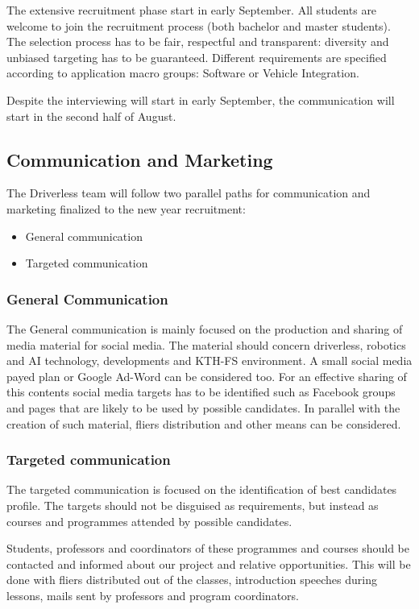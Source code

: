 \documentclass[graybox]{svmult}
\begin{document}
The extensive recruitment phase start in early September.
All students are welcome to join the recruitment process (both bachelor and master students).
The selection process has to be fair, respectful and transparent: diversity and unbiased targeting has to be guaranteed.
Different requirements are specified according to application macro groups: Software or Vehicle Integration.

Despite the interviewing will start in early September, the communication will start in the second half of August.

\subsection{Communication and Marketing}

The Driverless team will follow two parallel paths for communication and marketing finalized to the new year recruitment:
\begin{itemize}
    \item General communication
    \item Targeted communication
\end{itemize}

\subsubsection{General Communication}
The General communication is mainly focused on the production and sharing of media material for social media. The material should concern driverless, robotics and AI technology, developments and KTH-FS environment.
A small social media payed plan or Google Ad-Word can be considered too.
For an effective sharing of this contents social media targets has to be identified such as Facebook groups and pages that are likely to be used by possible candidates.
In parallel with the creation of such material, fliers distribution and other means can be considered.


\subsubsection{Targeted communication}
The targeted communication is focused on the identification of best candidates profile. The targets should not be disguised as requirements, but instead as courses and programmes attended by possible candidates.

Students, professors and coordinators of these programmes and courses should be contacted and informed about our project and relative opportunities.
This will be done with fliers distributed out of the classes, introduction speeches during lessons, mails sent by professors and program coordinators.
\end{document}
